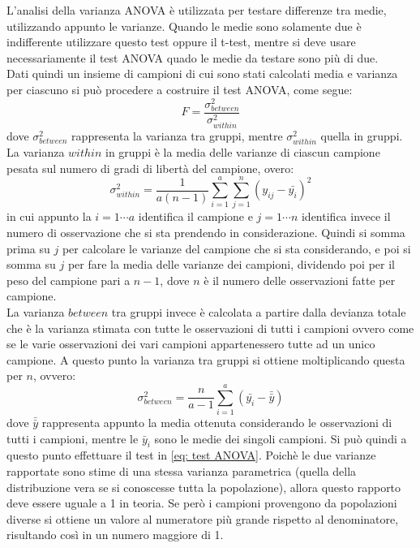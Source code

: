 \documentclass[]{article}
\begin{document}
\begin{tcolorbox}[colback=cyan!5!white, colframe=cyan!75!black, title = ANOVA]
	L'analisi della varianza ANOVA è utilizzata per testare differenze tra medie, utilizzando appunto le varianze. Quando le medie sono solamente due è indifferente utilizzare questo test oppure il t-test, mentre si deve usare necessariamente il test ANOVA quado le medie da testare sono più di due.\\
	Dati quindi un insieme di campioni di cui sono stati calcolati media e varianza per ciascuno si può procedere a costruire il test ANOVA, come segue:
	\begin{equation}
	F = \frac{\sigma^2_{between}}{\sigma^2_{within}}
	\label{eq: test ANOVA}
	\end{equation}
	dove $\sigma^2_{between}$ rappresenta la varianza tra gruppi, mentre $\sigma^2_{within}$ quella in gruppi.\\
	La varianza $within$ in gruppi è la media delle varianze di ciascun campione pesata sul numero di gradi di libertà del campione, overo:
	\begin{equation}
	\sigma^2_{within} = \frac{1}{a(n-1)}\sum_{i=1}^{a}\sum_{j=1}^{n}(y_{ij} - \bar{y_i})^2
	\end{equation}
	in cui appunto la $i = 1 \cdots a$ identifica il campione e $j = 1 \cdots n$ identifica invece il numero di osservazione che si sta prendendo in considerazione. Quindi si somma prima su $j$ per calcolare le varianze del campione che si sta considerando, e poi si somma su $j$ per fare la media delle varianze dei campioni, dividendo poi per il peso del campione pari a $n-1$, dove $n$ è il numero delle osservazioni fatte per campione. \\
	La varianza $between$ tra gruppi invece è calcolata a partire dalla devianza totale che è la varianza stimata con tutte le osservazioni di tutti i campioni ovvero come se le varie osservazioni dei vari campioni appartenessero tutte ad un unico campione. A questo punto la varianza tra gruppi si ottiene moltiplicando questa per $n$, ovvero:
	\begin{equation}
	\sigma^2_{between} = \frac{n}{a-1}\sum_{i=1}^{a} (\bar{y_i} - \bar{\bar{y}})
	\end{equation}
	dove $\bar{\bar{y}}$ rappresenta appunto la media ottenuta considerando le osservazioni di tutti i campioni, mentre le $\bar{y}_i$ sono le medie dei singoli campioni.	
	Si può quindi a questo punto effettuare il test in \eqref{eq: test ANOVA}. Poichè le due varianze rapportate sono stime di una stessa varianza parametrica (quella della distribuzione vera se si conoscesse tutta la popolazione), allora questo rapporto deve essere uguale a 1 in teoria. Se però i campioni provengono da popolazioni diverse si ottiene un valore al numeratore più grande rispetto al denominatore, risultando così in un numero maggiore di 1.\\

\end{tcolorbox}
\end{document}
